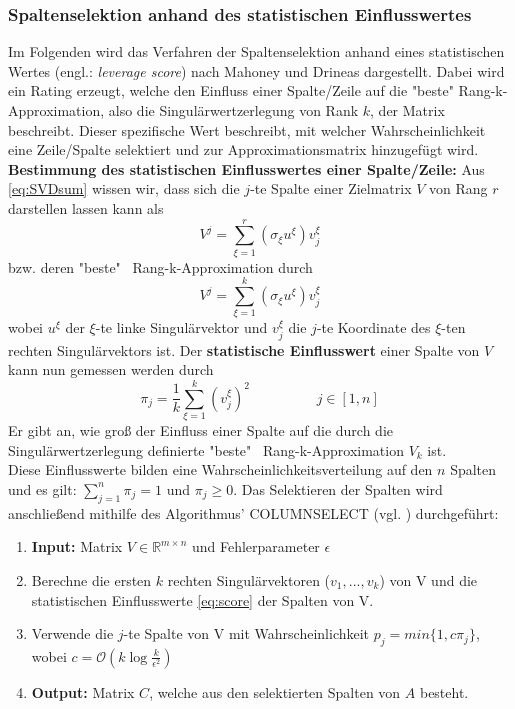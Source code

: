 \documentclass[12pt,a4paper,twoside]{article}
\begin{document}
		\subsubsection{Spaltenselektion anhand des statistischen Einflusswertes}
		Im Folgenden wird das Verfahren der Spaltenselektion anhand eines statistischen Wertes (engl.: 
		\textit{leverage score}) nach Mahoney und Drineas \citep{mahoney2008} dargestellt. Dabei wird ein Rating erzeugt, welche den 
		Einfluss einer Spalte/Zeile auf die "beste" Rang-k-Approximation, also die Singulärwertzerlegung von Rank $k$, der Matrix beschreibt. Dieser spezifische Wert beschreibt, mit welcher Wahrscheinlichkeit eine Zeile/Spalte selektiert und zur Approximationsmatrix hinzugefügt wird. \newline
		\newline	
		\textbf{Bestimmung des statistischen Einflusswertes einer Spalte/Zeile:} \newline 
		Aus \ref{eq:SVDsum} wissen wir, dass sich die $j$-te Spalte einer Zielmatrix $V$ von Rang $r$ darstellen lassen kann als
		\begin{equation*}
			V^j=\sum_{\xi=1}^r(\sigma_\xi u^\xi )v_j^\xi
		\end{equation*}
		bzw. deren "beste" \ Rang-k-Approximation durch
		\begin{equation*}
			V^j=\sum_{\xi=1}^k(\sigma_\xi u^\xi )v_j^\xi
		\end{equation*}
		wobei $u^\xi$ der $\xi$-te linke Singulärvektor und $v_j^\xi$ die $j$-te Koordinate des $\xi$-ten rechten 
		Singulärvektors ist. Der \textbf{statistische Einflusswert} einer Spalte von $V$ kann nun gemessen werden durch
		\begin{equation}
			\label{eq:score}
			\pi_j=\frac{1}{k}\sum_{\xi=1}^k(v_j^\xi)^2 \hspace{2cm} j\in [1,n]
		\end{equation}
		Er gibt an, wie groß der Einfluss einer Spalte auf die durch die Singulärwertzerlegung definierte "beste" \ Rang-k-Approximation $V_k$ ist. \\
		Diese Einflusswerte bilden eine Wahrscheinlichkeitsverteilung auf den $n$ Spalten und es gilt: $\sum_{j=1}^n\pi_j=1$ und $\pi_j\geq 0$. \newline
		Das Selektieren der Spalten wird anschließend mithilfe des Algorithmus' COLUMNSELECT (vgl. \citep{mahoney2008}) durchgeführt: 
		\begin{enumerate}
			\item \textbf{Input:} Matrix $V\in \mathds{R}^{m\times n}$ und Fehlerparameter $\epsilon$
			\item Berechne die ersten $k$ rechten Singulärvektoren ($v_1,...,v_k$) von V und die statistischen Einflusswerte \ref{eq:score} der Spalten von V.
			\item Verwende die $j$-te Spalte von V mit Wahrscheinlichkeit $p_j=min\{1,c\pi_j\}$, wobei $c=\mathcal{O}(k \log \frac{k}{\epsilon^2})$
			\item \textbf{Output:} Matrix $C$, welche aus den selektierten Spalten von $A$ besteht.
		\end{enumerate}
\end{document}
